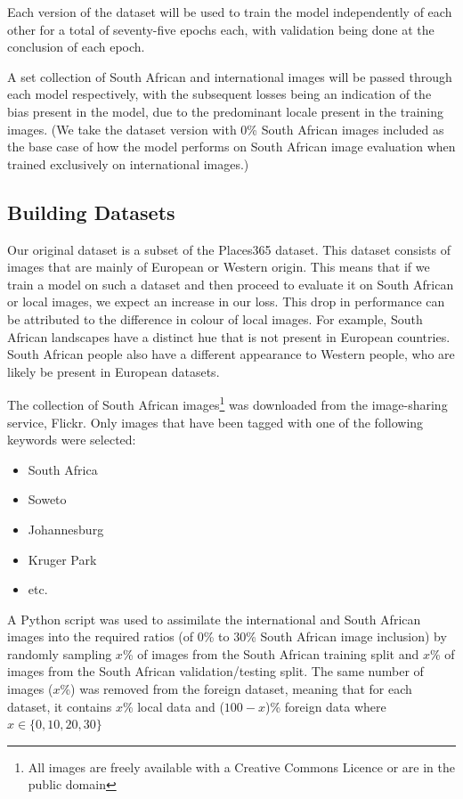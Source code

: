 \documentclass[conference]{IEEEtran}
\begin{document}
Each version of the dataset will be used to train the model independently of each other for a total of seventy-five epochs each, with validation being done at the conclusion of each epoch. 

A set collection of South African and international images will be passed through each model respectively, with the subsequent losses being an indication of the bias present in the model, due to the predominant locale present in the training images. (We take the dataset version with 0\% South African images included as the base case of how the model performs on South African image evaluation when trained exclusively on international images.)

\subsection{Building Datasets}

Our original dataset is a subset of the Places365 dataset. This dataset consists of images that are mainly of European or Western origin. This means that if we train a model on such a dataset and then proceed to evaluate it on South African or local images, we expect an increase in our loss. This drop in performance can be attributed to the difference in colour of local images. For example, South African landscapes have a distinct hue that is not present in European countries. South African people also have a different appearance to Western people, who are likely be present in European datasets.

The collection of South African images\footnote{All images are freely available with a Creative Commons Licence or are in the public domain} was downloaded from the image-sharing service, Flickr. Only images that have been tagged with one of the following keywords were selected:

\begin{itemize}
	\item South Africa
	\item Soweto
	\item Johannesburg
	\item Kruger Park
	\item etc.
\end{itemize}

A Python script was used to assimilate the international and South African images into the required ratios (of 0\% to 30\% South African image inclusion) by randomly sampling $x$\% of images from the South African training split and $x$\% of images from the South African validation/testing split. The same number of images ($x$\%) was removed from the foreign dataset, meaning that for each dataset, it contains $x$\% local data and ($100 - x$)\% foreign data where $x\in\{0, 10, 20, 30\}$
\end{document}
